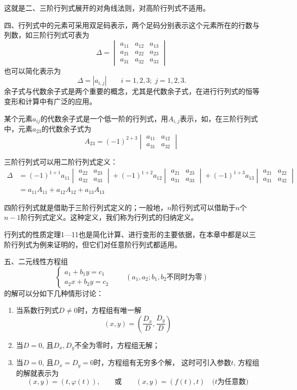 这就是二、三阶行列式展开的对角线法则，对高阶行列式不适用。

四、行列式中的元素可采用双足码表示，两个足码分别表示这个元素所在的行数与列数，如三阶行列式可表为
\[\Delta =\begin{vmatrix}
    a_{11}&a_{12}&a_{13}\\a_{21}&a_{22}&a_{23}\\a_{31}&a_{32}&a_{33}
\end{vmatrix}\]
也可以简化表示为
\[\Delta =|a_{i,j}|\qquad i=1,2,3;\; j=1,2,3.\]
余子式与代数余子式是两个重要的概念，尤其是代数余子式，在进行行列式的恒等变形和计算中有广泛的应用。

某个元素$a_{ij}$的代数余子式是一个低一阶的行列式，用$A_{i,j}$表示，如，在三阶行列式中，元素$a_{23}$的代数余子式为
\[A_{23}=(-1)^{2+3}\begin{vmatrix}
    a_{11}&a_{12}\\a_{31}&a_{32}
\end{vmatrix}\]

三阶行列式可以用二阶行列式定义：
\[\begin{split}
\Delta&=(-1)^{1+1}a_{11}\begin{vmatrix}
    a_{22}&a_{23}\\a_{32}&a_{33}
\end{vmatrix}+(-1)^{1+2}a_{12}\begin{vmatrix}
    a_{21}&a_{23}\\a_{31}&a_{33}
\end{vmatrix}+(-1)^{1+3}a_{13}\begin{vmatrix}
    a_{21}&a_{22}\\a_{31}&a_{32}
\end{vmatrix}\\
&=a_{11}A_{11}+a_{12}A_{12}+a_{13}A_{13}
\end{split}\]

四阶行列式就是借助于三阶行列式定义的；一般地，$n$阶行列式可以借助于$n$个$n-1$阶行列式定义。这种定义，我们称为行列式的归纳定义。

行列式的性质定理1—11也是简化计算、进行变形的主要依据，在本章中都是以三阶行列式为例来证明的，但它们对任意阶行列式都适用。

五、二元线性方程组
\[\begin{cases}
    a_1+b_1y=c_1\\
    a_2x+b_2y=c_2
\end{cases}\qquad (\text{$a_1,a_2; b_1,b_2$不同时为零})\]
的解可以分如下几种情形讨论：
\begin{enumerate}
    \item 当系数行列式$D\ne 0$时，方程组有唯一解
\[(x,y)=\left(\frac{D_x}{D},\frac{D_y}{D}\right)\]
\item 当$D=0$, 且$D_x,D_y$不全为零时，方程组无解；
\item 当$D=0$, 且$D_x=D_y=0$时，方程组有无穷多个解，
这时可引入参数$t$, 方程组的解就表示为
\[(x,y)=(t,\varphi(t)),\qquad \text{或}\qquad (x,y)=(f(t),t)\quad \text{($t$为任意数)}\]
\end{enumerate}



